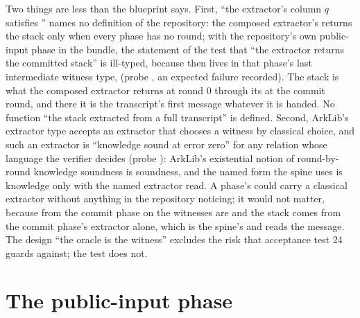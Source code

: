 Two things are less than the blueprint says. First, \enquote{the extractor's column $q$
satisfies } names no definition of the repository: the composed extractor's
 returns the stack only when every phase has no round; with the repository's
own public-input phase in the bundle, the statement of the test that \enquote{the extractor
returns the committed stack} is ill-typed, because  then lives in that phase's
last intermediate witness type,  (probe , an expected failure
recorded). The stack is what the composed extractor returns at round $0$ through its
 at the commit round, and there it is the transcript's first message whatever
it is handed. No function \enquote{the stack extracted from a full transcript} is defined.
Second, ArkLib's extractor type accepts an extractor that chooses a witness by classical choice,
and such an extractor is \enquote{knowledge sound at error zero} for any relation whose
language the verifier decides (probe ): ArkLib's existential notion of
round-by-round knowledge soundness is soundness, and the named form the spine uses is knowledge
only with the named extractor read. A phase's  could carry a classical extractor
without anything in the repository noticing; it would not matter, because from the commit phase
on the witnesses are  and the stack comes from the commit phase's extractor alone,
which is the spine's and reads the message. The design \enquote{the oracle is the witness}
excludes the risk that acceptance test 24 guards against; the test does not.

\section{The public-input phase}\label{sec:nv-pubinput}

